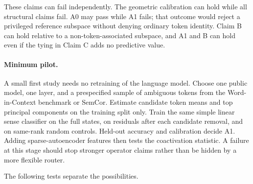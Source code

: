 \documentclass[
  aps,
  reprint,
  superscriptaddress,
  floatfix,
  nofootinbib,
  longbibliography
]{revtex4-2}
\begin{document}
These claims can fail independently.  The geometric calibration can hold while
all structural claims fail.  A0 may pass while A1 fails; that outcome
would reject a privileged reference subspace without denying ordinary token
identity.  Claim B can hold relative to a non-token-associated subspace, and
A1 and B can hold even if the tying in Claim C adds no predictive value.

\paragraph{Minimum pilot.}
A small first study needs no retraining of the language model.  Choose one
public model, one
layer, and a prespecified sample of ambiguous tokens from the Word-in-Context
benchmark or SemCor.  Estimate candidate token means and top principal
components on the training split only.  Train the same simple linear sense
classifier on the full states, on residuals after each candidate removal, and
on same-rank random controls.  Held-out accuracy and calibration decide A1.
Adding sparse-autoencoder features then tests the coactivation statistic.  A
failure at this stage should stop stronger operator claims rather than be
hidden by a more flexible router.

The following tests separate the possibilities.
\end{document}
